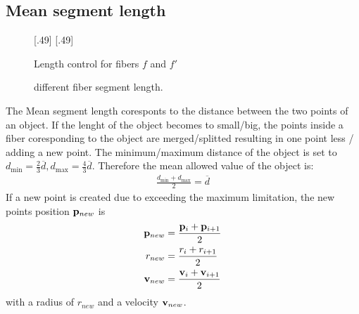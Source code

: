 \subsection{Mean segment length}
% 
\begin{figure}[!t]
    \centering
    \def\tikzwidth{.45\textwidth}
    [.49\textwidth]{
    }
    [.49\textwidth]{
    }
	\caption{Length control for fibers $f$ and $f'$}
	\label{fig:merge_split}
\end{figure}
% 
% 
\begin{figure}[!t]
    \centering
    \def\tikzwidth{0.75\textwidth}
    \tikzset{external/export next=false}
	\caption{different fiber segment length.}
	\label{fig:model_length}
\end{figure}
% 
The Mean segment length coresponts to the distance between the two points of an object.
If the lenght of the object becomes to small/big, the points inside a fiber coresponding to the object are merged/splitted resulting in one point less / adding a new point.
The minimum/maximum distance of the object is set to $d_{\min} = \frac{2}{3} \overline{d}, d_{\max} = \frac{4}{3}\overline{d}$.
Therefore the mean allowed value of the object is:
\begin{align}
\frac{d_{\min} + d_{\max}}{2} = \overline{d}
\end{align}
% 
If a new point is created due to exceeding the maximum limitation, the new points position $\mathbf{p}_{new}$ is 
\begin{align}
\begin{split}
\mathbf{p}_{new} &= \frac{\mathbf{p}_{i} + \mathbf{p}_{i+1}}{2}\\
r_{new} &= \frac{r_{i} + r_{i+1}}{2}\\
\mathbf{v}_{new} &= \frac{\mathbf{v}_{i} + \mathbf{v}_{i+1}}{2}
\end{split}
\end{align}
with a radius of $r_{new}$ and a velocity $\mathbf{v}_{new}$.
% 
